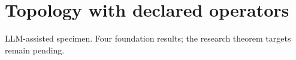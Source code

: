\documentclass{article}
\begin{document}
\section*{Topology with declared operators}
LLM-assisted specimen. Four foundation results; the research theorem targets remain pending.

\end{document}
